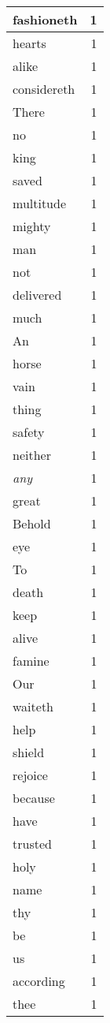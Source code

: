 \begin{center}
\begin{longtable}{l|r}
fashioneth & 1 \\ \hline
hearts & 1 \\ \hline
alike & 1 \\ \hline
considereth & 1 \\ \hline
There & 1 \\ \hline
no & 1 \\ \hline
king & 1 \\ \hline
saved & 1 \\ \hline
multitude & 1 \\ \hline
mighty & 1 \\ \hline
man & 1 \\ \hline
not & 1 \\ \hline
delivered & 1 \\ \hline
much & 1 \\ \hline
An & 1 \\ \hline
horse & 1 \\ \hline
vain & 1 \\ \hline
thing & 1 \\ \hline
safety & 1 \\ \hline
neither & 1 \\ \hline
\emph{any} & 1 \\ \hline
great & 1 \\ \hline
Behold & 1 \\ \hline
eye & 1 \\ \hline
To & 1 \\ \hline
death & 1 \\ \hline
keep & 1 \\ \hline
alive & 1 \\ \hline
famine & 1 \\ \hline
Our & 1 \\ \hline
waiteth & 1 \\ \hline
help & 1 \\ \hline
shield & 1 \\ \hline
rejoice & 1 \\ \hline
because & 1 \\ \hline
have & 1 \\ \hline
trusted & 1 \\ \hline
holy & 1 \\ \hline
name & 1 \\ \hline
thy & 1 \\ \hline
be & 1 \\ \hline
us & 1 \\ \hline
according & 1 \\ \hline
thee & 1 \\ \hline
\end{longtable}
\end{center}



